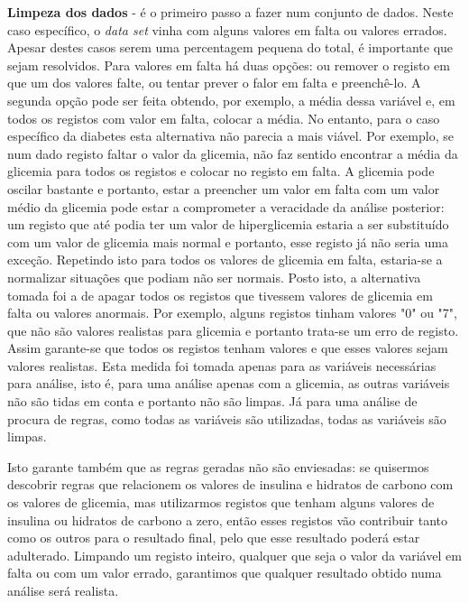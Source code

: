 \textbf{Limpeza dos dados} - é o primeiro passo a fazer num conjunto de dados. Neste caso específico, o \textit{data set} vinha com alguns valores em falta ou valores errados. Apesar destes casos serem uma percentagem pequena do total, é importante que sejam resolvidos. Para valores em falta há duas opções: ou remover o registo em que um dos valores falte, ou tentar prever o falor em falta e preenchê-lo. A segunda opção pode ser feita obtendo, por exemplo, a média dessa variável e, em todos os registos com valor em falta, colocar a média. No entanto, para o caso específico da diabetes esta alternativa não parecia a mais viável. Por exemplo, se num dado registo faltar o valor da glicemia, não faz sentido encontrar a média da glicemia para todos os registos e colocar no registo em falta. A glicemia pode oscilar bastante e portanto, estar a preencher um valor em falta com um valor médio da glicemia pode estar a comprometer a veracidade da análise posterior: um registo que até podia ter um valor de hiperglicemia estaria a ser substituído com um valor de glicemia mais normal e portanto, esse registo já não seria uma exceção. Repetindo isto para todos os valores de glicemia em falta, estaria-se a normalizar situações que podiam não ser normais. Posto isto, a alternativa tomada foi a de apagar todos os registos que tivessem valores de glicemia em falta ou valores anormais. Por exemplo, alguns registos tinham valores "0" ou "7", que não são valores realistas para glicemia e portanto trata-se um erro de registo. Assim garante-se que todos os registos tenham valores e que esses valores sejam valores realistas. Esta medida foi tomada apenas para as variáveis necessárias para análise, isto é, para uma análise apenas com a glicemia, as outras variáveis não são tidas em conta e portanto não são limpas. Já para uma análise de procura de regras, como todas as variáveis são utilizadas, todas as variáveis são limpas. 

Isto garante também que as regras geradas não são enviesadas: se quisermos descobrir regras que relacionem os valores de insulina e hidratos de carbono com os valores de glicemia, mas utilizarmos registos que tenham alguns valores de insulina ou hidratos de carbono a zero, então esses registos vão contribuir tanto como os outros para o resultado final, pelo que esse resultado poderá estar adulterado. Limpando um registo inteiro, qualquer que seja o valor da variável em falta ou com um valor errado, garantimos que qualquer resultado obtido numa análise será realista.



